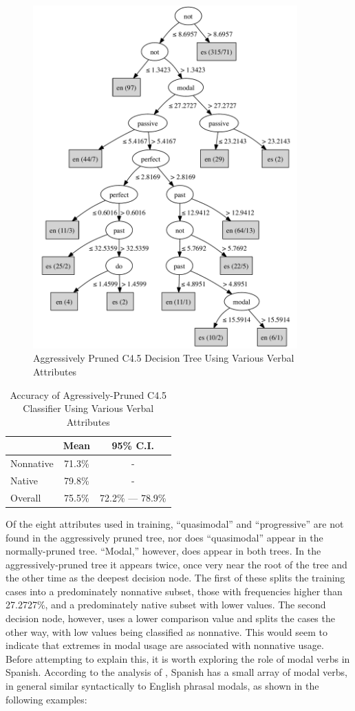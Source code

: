 \documentclass[main.tex]{subfiles}
\begin{document}
\begin{figure}[htbp]
\centering
\includegraphics[width=4.0in]{pruned-basic-verb-tree.pdf}
\caption{Aggressively Pruned C4.5 Decision Tree Using Various Verbal Attributes}
\label{fig:pruned-basic-verb-tree}
\end{figure}
\FloatBarrier
\begin{table}[htbp]
\centering
\caption{Accuracy of Agressively-Pruned C4.5 Classifier Using Various Verbal Attributes}
\begin{tabular}{l c c}
\toprule
& Mean & 95\% C.I.\\
\midrule
Nonnative & 71.3\% & - \\
[6pt]Native & 79.8\% & - \\
[6pt]Overall & 75.5\% & 72.2\% --- 78.9\% \\
\bottomrule
\end{tabular}
\label{table:pruned-basic-verb-results}
\end{table}
Of the eight attributes used in training, ``quasimodal'' and ``progressive'' are not found in the aggressively pruned tree, nor does ``quasimodal'' appear in the normally-pruned tree. ``Modal,'' however, does appear in both trees. In the aggressively-pruned tree it appears twice, once very near the root of the tree and the other time as the deepest decision node. The first of these splits the training cases into a predominately nonnative subset, those with frequencies higher than 27.2727\%, and a predominately native subset with lower values. The second decision node, however, uses a lower comparison value and splits the cases the other way, with low values being classified as nonnative. This would seem to indicate that extremes in modal usage are associated with nonnative usage. Before attempting to explain this, it is worth exploring the role of modal verbs in Spanish. According to the analysis of \citet{butt}, Spanish has a small array of modal verbs, in general similar syntactically to English phrasal modals, as shown in the following examples:
\end{document}
